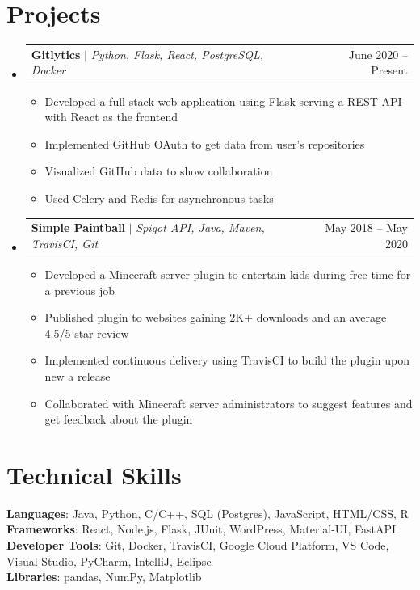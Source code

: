 \documentclass[letterpaper,11pt]{article}
\makeatletter
\newcommand{\resumeItem}[1]{
  \item\small{{#1 \vspace{-2pt}}}
}
\newcommand{\resumeProjectHeading}[2]{
    \item
    \begin{tabular*}{0.97\textwidth}{l@{\extracolsep{\fill}}r}
      \small#1 & #2 \\
    \end{tabular*}\vspace{-7pt}
}
\newcommand{\resumeSubHeadingListStart}{\begin{itemize}[leftmargin=0.15in, label={}]}
\newcommand{\resumeSubHeadingListEnd}{\end{itemize}}
\newcommand{\resumeItemListStart}{\begin{itemize}}
\newcommand{\resumeItemListEnd}{\end{itemize}\vspace{-5pt}}
\makeatother
\begin{document}
\section{Projects}
  \resumeSubHeadingListStart
    \resumeProjectHeading
      {\textbf{Gitlytics} $|$ \emph{Python, Flask, React, PostgreSQL, Docker}}{June 2020 -- Present}
      \resumeItemListStart
        \resumeItem{Developed a full-stack web application using Flask serving a REST API with React as the frontend}
        \resumeItem{Implemented GitHub OAuth to get data from user's repositories}
        \resumeItem{Visualized GitHub data to show collaboration}
        \resumeItem{Used Celery and Redis for asynchronous tasks}
      \resumeItemListEnd
    \resumeProjectHeading
      {\textbf{Simple Paintball} $|$ \emph{Spigot API, Java, Maven, TravisCI, Git}}{May 2018 -- May 2020}
      \resumeItemListStart
        \resumeItem{Developed a Minecraft server plugin to entertain kids during free time for a previous job}
        \resumeItem{Published plugin to websites gaining 2K+ downloads and an average 4.5/5-star review}
        \resumeItem{Implemented continuous delivery using TravisCI to build the plugin upon new a release}
        \resumeItem{Collaborated with Minecraft server administrators to suggest features and get feedback about the plugin}
      \resumeItemListEnd
  \resumeSubHeadingListEnd

\section{Technical Skills}
  \begin{itemize}[leftmargin=0.15in, label={}]
    \small{\item{
      \textbf{Languages}{: Java, Python, C/C++, SQL (Postgres), JavaScript, HTML/CSS, R} \\
      \textbf{Frameworks}{: React, Node.js, Flask, JUnit, WordPress, Material-UI, FastAPI} \\
      \textbf{Developer Tools}{: Git, Docker, TravisCI, Google Cloud Platform, VS Code, Visual Studio, PyCharm, IntelliJ, Eclipse} \\
      \textbf{Libraries}{: pandas, NumPy, Matplotlib}
    }}
  \end{itemize}
\end{document}
